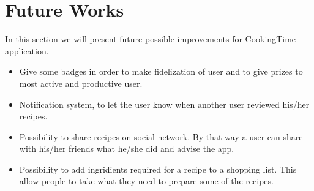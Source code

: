 \chapter{Future Works}
In this section we will present future possible improvements for CookingTime application.
\begin{itemize}
	\item Give some badges in order to make fidelization of user and to give prizes to most active and productive user.
	\item Notification system, to let the user know when another user reviewed his/her recipes.
	\item Possibility to share recipes on social network. By that way a user can share with his/her friends what he/she did and advise the app. 
	\item Possibility to add ingridients required for a recipe to a shopping list. This allow people to take what they need to prepare some of the recipes.
\end{itemize}